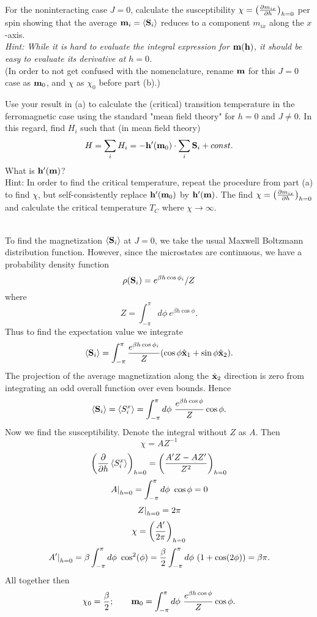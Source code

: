 \documentclass[10pt,letterpaper]{article}
\begin{document}
	
	\benum
	\item
	For the noninteracting case $J=0$, calculate the susceptibility $\chi = \plr{\pdiff[m_{ix}]{h}}_{h=0}$ per
	spin showing that the average $\vect m_i = \braket{\vect S_i}$ reduces to a component $m_{ix}$ along
	the $x$-axis. 
	\\
	\emph{Hint: While it is hard to evaluate the integral expression for $\vect m(\vect h)$, it should
	be easy to evaluate its derivative at $h=0$.} \\
	(In order to not get confused with the nomenclature, rename $\vect m$ for this $J=0$ case as $\vect m_0$,
	and $\chi$ as $\chi_0$ before part (b).)
	
	\item
	Use your result in (a) to calculate the (critical) transition temperature in the ferromagnetic case using the 
	standard "mean field theory" for $h=0$ and $J\ne 0$. In this regard, find $H_i$ such that (in mean field theory)
	\[
		H = \sum_i H_i = -\vect h'(\vect m_0)\cdot \sum_i \vect S_i + const.
	\]
	What is $\vect h'(\vect m)$? 
	\\
	Hint: In order to find the critical temperature, repeat the procedure from part (a) to find $\chi$, but 
	self-consistently replace $\vect h'(\vect m_0)$ by $\vect h'(\vect m)$. The find $\chi = \plr{
	\pdiff[m_{ix}]{h}}_{h=0}$ and calculate the critical temperature $T_C$ where $\chi \to \infty$. 
	\\ \\ 
	\eenum
	
	\benum
	\item
	To find the magnetization $\braket{\vect S_i}$ at $J=0$, we take the usual Maxwell Boltzmann distribution
	function. However, since the microstates are continuous, we have a probability density function
	\[
		\rho(\vect S_i) = e^{\beta h\cos\phi_i}/Z
	\]
	where 
	\[
		Z = \int_{-\pi}^\pi d\phi\ e^{\beta h\cos\phi}.
	\]
	Thus to find the expectation value we integrate
	\[
		\braket{\vect S_i} = \int_{-\pi}^\pi \frac{e^{\beta h\cos\phi_i}}{Z}(\cos\phi \vecth x_1 +\sin\phi \vecth x_2).
	\]
	The projection of the average magnetization along the $\vecth x_2$ direction is zero from 
	integrating an odd overall function over even bounds. Hence
	\[
		\braket{\vect S_i} = \braket{S^x_i} = \int_{-\pi}^\pi d\phi\ \frac{e^{\beta h\cos\phi}}Z \cos\phi.
	\]
	Now we find the susceptibility. Denote the integral without $Z$ as $A$. Then
	\[
		\chi = AZ^{-1}
	\]
	\[
		\plr{\pdiff{h}\braket{S_i^x}}_{h=0} = \pfrac{A'Z-AZ'}{Z^2}_{h=0} 
	\]
	\[
		\elr{A}_{h=0} = \int_{-\pi}^\pi d\phi \ \cos\phi = 0
	\]
	\[
		\elr{Z}_{h=0} = 2\pi
	\]
	\[
		\chi = \pfrac{A'}{2\pi}_{h=0}
	\]
	\[
		\elr{A'}_{h=0} = \beta \int_{-\pi}^\pi d\phi \ \cos^2(\phi) = \frac{\beta}{2} \int_{-\pi}^\pi d\phi \ (1+\cos(2\phi))
		= \beta\pi.
	\]
	All together then
	\[
		\chi_0 = \frac{\beta}{2};\qquad \vect m_0 = \int_{-\pi}^\pi d\phi\ \frac{e^{\beta h\cos\phi}}Z \cos\phi.
	\]
	\\ \\
	
\end{document}
